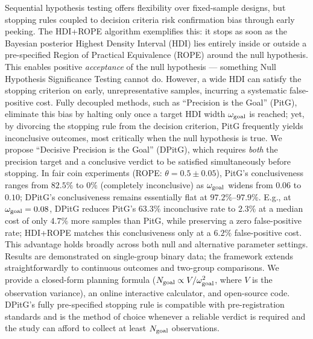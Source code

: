 Sequential hypothesis testing offers flexibility over fixed-sample designs, but stopping
rules coupled to decision criteria risk confirmation bias through early peeking.
The HDI+ROPE algorithm exemplifies this: it stops as soon as the Bayesian posterior
Highest Density Interval (HDI) lies entirely inside or outside a pre-specified Region
of Practical Equivalence (ROPE) around the null hypothesis. This enables positive \textit{acceptance} of the null hypothesis ---
something Null Hypothesis Significance Testing cannot do. However, a wide HDI can satisfy the stopping criterion on early, unrepresentative samples,
incurring a systematic false-positive cost.
Fully decoupled methods, such as ``Precision is the Goal'' (PitG), eliminate this bias by
halting only once a target HDI width $\omega_{\rm goal}$ is reached; yet, by divorcing
the stopping rule from the decision criterion, PitG frequently yields inconclusive
outcomes, most critically when the null hypothesis is true.
We propose ``Decisive Precision is the Goal'' (DPitG), which requires \textit{both}
the precision target and a conclusive verdict to be satisfied simultaneously before
stopping.
In fair coin experiments (ROPE: $\theta = 0.5 \pm 0.05$), PitG's
conclusiveness ranges from $82.5\%$ to $0\%$ (completely inconclusive) as $\omega_{\rm goal}$
widens from $0.06$ to $0.10$;
DPitG's conclusiveness remains essentially flat at $97.2\%$--$97.9\%$.
E.g., at $\omega_{\rm goal}=0.08$, DPitG reduces PitG's $63.3\%$ inconclusive rate to $2.3\%$
at a median cost of only $4.7\%$ more samples than PitG, while preserving
a zero false-positive rate; HDI+ROPE matches this conclusiveness only at a $6.2\%$
false-positive cost. This advantage holds broadly across both null and alternative parameter settings.
Results are demonstrated on single-group binary data; the framework extends straightforwardly
to continuous outcomes and two-group comparisons.
We provide a closed-form planning formula
($N_{\rm goal} \propto V/\omega_{\rm goal}^2$, where $V$ is the observation variance),
an online interactive calculator, and open-source code.
DPitG's fully pre-specified stopping rule is compatible with pre-registration standards
and is the method of choice whenever a reliable verdict is required and the study
can afford to collect at least $N_{\rm goal}$ observations.


